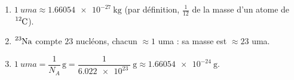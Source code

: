\documentclass[11pt,a4paper]{article}
\begin{document}
\begin{corrige}
\begin{enumerate}[label=\alph*)]
  \item $\SI{1}{uma} \approx \SI{1,66054e-27}{\kilo\gram}$ (par définition, $\tfrac{1}{12}$ de la masse
        d'un atome de $\ce{^{12}C}$).
  \item $\ce{^{23}Na}$ compte $23$ nucléons, chacun $\approx 1$ uma : sa masse est $\approx 23$ uma.
  \item $\SI{1}{uma} = \dfrac{1}{N_{\!A}}\,\si{\gram} = \dfrac{1}{\SI{6,022e23}{}}\ \si{\gram}
        \approx \SI{1,66054e-24}{\gram}$.
\end{enumerate}
\end{corrige}
\end{document}
